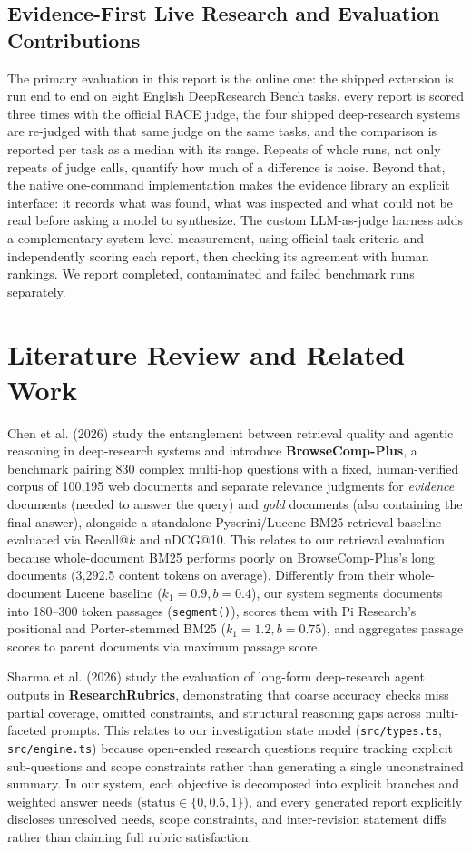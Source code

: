 \documentclass[conference]{IEEEtran}
\begin{document}
\subsection{Evidence-First Live Research and Evaluation Contributions}
The primary evaluation in this report is the online one: the shipped extension is run end to end on eight English DeepResearch Bench tasks, every report is scored three times with the official RACE judge, the four shipped deep-research systems are re-judged with that same judge on the same tasks, and the comparison is reported per task as a median with its range. Repeats of whole runs, not only repeats of judge calls, quantify how much of a difference is noise. Beyond that, the native one-command implementation makes the evidence library an explicit interface: it records what was found, what was inspected and what could not be read before asking a model to synthesize. The custom LLM-as-judge harness adds a complementary system-level measurement, using official task criteria and independently scoring each report, then checking its agreement with human rankings. We report completed, contaminated and failed benchmark runs separately.

\section{Literature Review and Related Work}

Chen et al. (2026) study the entanglement between retrieval quality and agentic reasoning in deep-research systems and introduce \textbf{BrowseComp-Plus}, a benchmark pairing 830 complex multi-hop questions with a fixed, human-verified corpus of 100,195 web documents and separate relevance judgments for \textit{evidence} documents (needed to answer the query) and \textit{gold} documents (also containing the final answer), alongside a standalone Pyserini/Lucene BM25 retrieval baseline evaluated via Recall@$k$ and nDCG@10. This relates to our retrieval evaluation because whole-document BM25 performs poorly on BrowseComp-Plus's long documents (3,292.5 content tokens on average). Differently from their whole-document Lucene baseline ($k_1 = 0.9, b = 0.4$), our system segments documents into 180--300 token passages (\texttt{segment()}), scores them with Pi Research's positional and Porter-stemmed BM25 ($k_1 = 1.2, b = 0.75$), and aggregates passage scores to parent documents via maximum passage score.

Sharma et al. (2026) study the evaluation of long-form deep-research agent outputs in \textbf{ResearchRubrics}, demonstrating that coarse accuracy checks miss partial coverage, omitted constraints, and structural reasoning gaps across multi-faceted prompts. This relates to our investigation state model (\texttt{src/types.ts}, \texttt{src/engine.ts}) because open-ended research questions require tracking explicit sub-questions and scope constraints rather than generating a single unconstrained summary. In our system, each objective is decomposed into explicit branches and weighted answer needs ($\text{status} \in \{0, 0.5, 1\}$), and every generated report explicitly discloses unresolved needs, scope constraints, and inter-revision statement diffs rather than claiming full rubric satisfaction.
\end{document}
